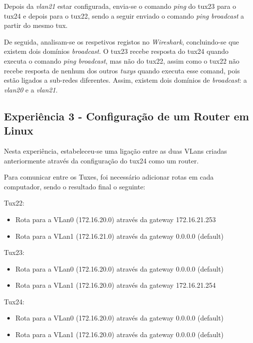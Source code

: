 \documentclass[11pt]{article}
\begin{document}
Depois da \textit{vlan21} estar configurada, envia-se o comando \textit{ping} do tux23 para o tux24 e depois para o tux22, sendo a seguir enviado o comando \textit{ping broadcast} a partir do mesmo tux.

De seguida, analisam-se os respetivos registos no \textit{Wireshark}, concluindo-se que existem dois domínios \textit{broadcast}. O tux23 recebe resposta do tux24 quando executa o comando \textit{ping broadcast}, mas não do tux22, assim como o tux22 não recebe resposta de nenhum dos outros \textit{tuxys} quando executa esse comand, pois estão ligados a sub-redes diferentes. Assim, existem dois domínios de \textit{broadcast}: a \textit{vlan20} e a \textit{vlan21}. 

\subsection{Experiência 3 - Configuração de um Router em Linux}

Nesta experiência, estabeleceu-se uma ligação entre as duas VLans criadas anteriormente através da configuração do tux24 como um router.

Para comunicar entre os Tuxes, foi necessário adicionar rotas em cada computador, sendo o resultado final o seguinte:

Tux22:
\begin{itemize}
\item Rota para a VLan0 (172.16.20.0) através da gateway 172.16.21.253
\item Rota para a VLan1 (172.16.21.0) através da gateway 0.0.0.0 (default)

\end{itemize}

Tux23:
\begin{itemize}
\item Rota para a VLan0 (172.16.20.0) através da gateway 0.0.0.0 (default)
\item Rota para a VLan1 (172.16.20.0) através da gateway 172.16.21.254

\end{itemize}

Tux24:
\begin{itemize}
\item Rota para a VLan0 (172.16.20.0) através da gateway 0.0.0.0 (default)
\item Rota para a VLan1 (172.16.20.0) através da gateway 0.0.0.0 (default)
	
\end{itemize}
\end{document}
